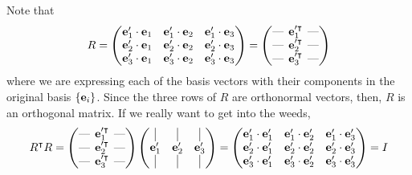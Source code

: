 \documentclass{../template/note}
\begin{document}
    Note that
    \begin{align*}
        R = \begin{pmatrix}
         \V e_1' \cdot \V e_1 & \V e_1' \cdot \V e_2 & \V e_1' \cdot \V e_3 \\
         \V e_2' \cdot \V e_1 & \V e_2' \cdot \V e_2 & \V e_2' \cdot \V e_3 \\
         \V e_3' \cdot \V e_1 & \V e_3' \cdot \V e_2 & \V e_3' \cdot \V e_3 \\
        \end{pmatrix} = \begin{pmatrix}
         \lln & \V e_1'^\intercal & \rln \\ 
         \lln & \V e_2'^\intercal & \rln \\ 
         \lln & \V e_3'^\intercal & \rln \\
        \end{pmatrix}
    \end{align*}
    where we are expressing each of the basis vectors with their components in the original basis \(\{\V e_i\}\). Since the three rows of \(R\) are orthonormal vectors, then, \(R\) is an orthogonal matrix. If we really want to get into the weeds,
    \begin{align*}
        R^\intercal R = \begin{pmatrix}
            \lln & \V e_1'^\intercal & \rln \\ 
            \lln & \V e_2'^\intercal & \rln \\ 
            \lln & \V e_3'^\intercal & \rln \\ 
        \end{pmatrix} \begin{pmatrix}
            \vline & \vline & \vline \\ 
            \V e_1' & \V e_2' & \V e_3' \\
            \vline & \vline & \vline \\ 
        \end{pmatrix} = \begin{pmatrix}
            \V e_1' \cdot \V e_1' & \V e_1' \cdot \V e_2' & \V e_1' \cdot \V e_3' \\
            \V e_2' \cdot \V e_1' & \V e_2' \cdot \V e_2' & \V e_2' \cdot \V e_3' \\
            \V e_3' \cdot \V e_1' & \V e_3' \cdot \V e_2' & \V e_3' \cdot \V e_3' \\
        \end{pmatrix} = I
    \end{align*}
\end{document}
